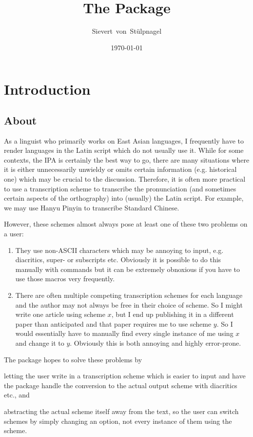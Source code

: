 \documentclass{ltxdockit}
\title{The \sty{transconv} Package}
\author{Sievert\ von\ St\"{u}lpnagel}
\date{\today}
\begin{document}
\maketitle

\tableofcontents
\listoftables

\section{Introduction}
\label{int}

\subsection[About]{About }

As a linguist who primarily works on East Asian languages, I frequently have to
render languages in the Latin script which do not usually use it. While for some
contexts, the IPA is certainly the best way to go, there are many situations
where it is either unnecessarily unwieldy or omits certain information (e.g.
historical one) which may be crucial to the discussion. Therefore, it is often
more practical to use a transcription scheme to transcribe the pronunciation
(and sometimes certain aspects of the orthography) into (usually) the Latin
script. For example, we may use Hanyu Pinyin to transcribe Standard Chinese.

However, these schemes almost always pose at least one of these two problems on
a  user:

\begin{enumerate}
  \item They use non-ASCII characters which may be annoying to input, e.g.
    diacritics, super- or subscripts etc. Obviously it is possible to do this
    manually with  commands but it can be extremely obnoxious if you
    have to use those macros very frequently.
  \item There are often multiple competing transcription schemes for each
    language and the author may not always be free in their choice of scheme.
    So I might write one article using scheme \(x\), but I end up publishing it
    in a different paper than anticipated and that paper requires me to use
    scheme \(y\). So I would essentially have to manually find every single
    instance of me using \(x\) and change it to \(y\). Obviously this is both
    annoying and highly error-prone.
\end{enumerate}

The   package hopes to solve these problems by
\begin{enumerate*}[label=\alph*)]
  \item letting the user write in a transcription scheme which is easier to
    input and have the package handle the conversion to the actual output scheme
    with diacritics etc., and
  \item abstracting the actual scheme itself away from the text, so the user can
    switch schemes by simply changing an option, not every instance of them
    using the scheme.
\end{enumerate*}
\end{document}
